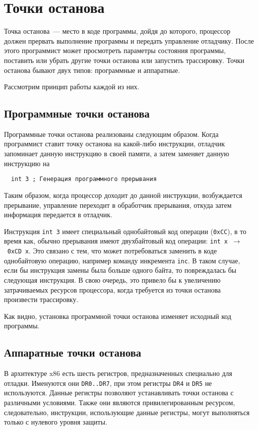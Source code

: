 
\section{Точки останова}
Точка останова~--- место в коде программы, дойдя до которого, процессор должен
прервать выполнение программы и передать управление отладчику. После этого
программист может просмотреть параметры состояния программы, поставить или
убрать другие точки останова или запустить трассировку. Точки останова бывают
двух типов: программные и аппаратные.

Рассмотрим принцип работы каждой из них.

\subsection{Программные точки останова}
Программные точки останова реализованы следующим образом. Когда программист
ставит точку останова на какой-либо инструкции, отладчик запоминает данную
инструкцию в своей памяти, а затем заменяет данную инструкцию на 
\begin{verbatim}
  int 3 ; Генерация программного прерывания
\end{verbatim}
Таким образом, когда процессор доходит до данной инструкции, возбуждается
прерывание, управление переходит в обработчик прерывания, откуда затем
информация передается в отладчик. 

Инструкция \verb!int 3! имеет специальный однобайтовый код операции
(\verb!0xCC!), в то время как, обычно прерывания имеют двухбайтовый код
операции: \verb!int x!~$\to$~\verb!0xCD x!. Это связано с тем, что может
потребоваться заменить в коде однобайтовую операцию, например команду инкремента
\verb!inc!. В таком случае, если бы инструкция замены была больше одного байта,
то повреждалась бы следующая инструкция. В свою очередь, это привело бы к
увеличению затрачиваемых ресурсов процессора, когда требуется из точки останова
произвести трассировку.

Как видно, установка программной точки останова изменяет исходный код
программы.

\subsection{Аппаратные точки останова}
В архитектуре x86 есть шесть регистров, предназначенных специально для отладки.
Именуются они \verb!DR0..DR7!, при этом регистры \verb!DR4! и \verb!DR5! не
используются. Данные регистры позволяют устанавливать точки останова с
различными условиями. Также они являются привилегированным ресурсом,
следовательно, инструкции, использующие данные регистры, могут выполняться
только с нулевого уровня защиты.

